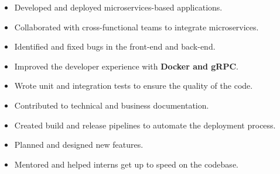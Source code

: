 \documentclass[10pt,a4paper,ragged2e]{altacv}
\begin{document}

\personalinfo{%
	
}

\begin{fullwidth}
	\makecvheader
\end{fullwidth}





\begin{itemize}
  \item Developed and deployed microservices-based applications.
  \item Collaborated with cross-functional teams to integrate microservices.
  \item Identified and fixed bugs in the front-end and back-end.
  \item Improved the developer experience with \textbf{Docker and gRPC}.
  \item Wrote unit and integration tests to ensure the quality of the code.
  \item Contributed to technical and business documentation.
  \item Created build and release pipelines to automate the deployment process.
  \item Planned and designed new features.
  \item Mentored and helped interns get up to speed on the codebase.
\end{itemize}

   

    

 

\divider
\end{document}
